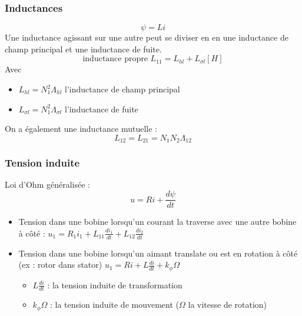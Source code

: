 \documentclass[../main.tex]{subfiles}
\begin{document}
\subsubsection{Inductances}
\begin{equation}
    \psi = Li
\end{equation}
Une inductance agissant sur une autre peut se diviser en en une inductance de champ principal et une inductance de fuite.\\
\begin{equation}
    \text{inductance propre } L_{11} = L_{hl}+L_{\sigma l} [H]
\end{equation}
Avec \begin{itemize}
    \item $L_{hl} = N_1^2 \Lambda_{hl}$ l'inductance de champ principal\\
    \item $L_{\sigma l} = N_1^2 \Lambda_{\sigma l}$ l'inductance de fuite\\
\end{itemize}

On a également une inductance mutuelle : \begin{equation}
    L_{12} = L_{21} = N_1 N_2 \Lambda_{12}
\end{equation}


\subsubsection{Tension induite}
Loi d'Ohm généralisée : \begin{equation}
    u = Ri+ \frac{d\psi}{dt}
\end{equation}

\begin{itemize}
    \item Tension dans une bobine lorsqu'un courant la traverse avec une autre bobine à côté : $u_1 = R_1 i_1 + L_{11} \frac{di_1}{dt} + L_{12} \frac{di_2}{dt}$\\
    \item Tension dans une bobine lorsqu'un aimant translate ou est en rotation à côté (ex : rotor dans stator) $u_1 = Ri + L \frac{di}{dt} + k_{\phi} \Omega$\begin{itemize}
        \item $L \frac{di}{dt}$ : la tension induite de transformation\\
        \item $k_\phi \Omega$ : la tension induite de mouvement ($\Omega$ la vitesse de rotation)\\
    \end{itemize} 
\end{itemize}
\end{document}
